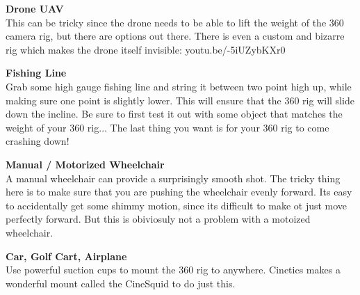 \begin{fullwidth}
{\bf Drone UAV}
\\
This can be tricky since the drone needs to be able to lift the weight of the 360 camera rig, but there are options out there. There is even a custom and bizarre rig which makes the drone itself invisible: youtu.be/-5iUZybKXr0

{\bf Fishing Line}
\\
Grab some high gauge fishing line and string it between two point high up, while making sure one point is slightly lower. This will ensure that the 360 rig will slide down the incline. Be sure to first test it out with some object that matches the weight of your 360 rig... The last thing you want is for your 360 rig to come crashing down!

{\bf Manual / Motorized Wheelchair}
\\
A manual wheelchair can provide a surprisingly smooth shot. The tricky thing here is to make sure that you are pushing the wheelchair evenly forward. Its easy to accidentally get some shimmy motion, since its difficult to make ot just move perfectly forward. But this is obiviosuly not a problem with a motoized wheelchair. 

{\bf Car, Golf Cart, Airplane}
\\
Use powerful suction cups to mount the 360 rig to anywhere. Cinetics makes a wonderful mount called the CineSquid to do just this.





\clearpage
\end{fullwidth}
